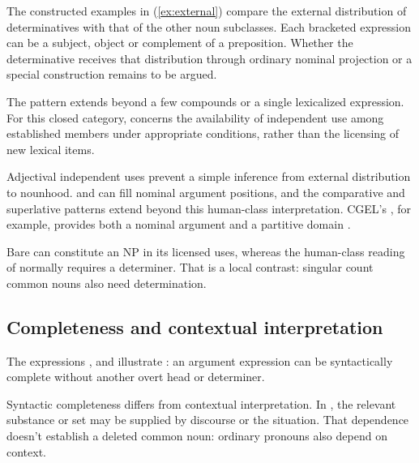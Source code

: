 \documentclass[12pt]{article}
\begin{document}
The constructed examples in (\ref{ex:external}) compare the external distribution of determinatives with that of the other noun subclasses. Each bracketed expression can be a subject, object or complement of a preposition. Whether the determinative receives that distribution through ordinary nominal projection or a special construction remains to be argued.

\ea\label{ex:external}
\ea {}\qquad {}\qquad {}
\ex {}\qquad {}\qquad {}
\ex {}\qquad {}\qquad {}
\ex {}\qquad {}\qquad {}
\z\z

The pattern extends beyond a few compounds or a single lexicalized expression. For this closed category,  concerns the availability of independent use among established members under appropriate conditions, rather than the licensing of new lexical items.

Adjectival independent uses prevent a simple inference from external distribution to nounhood.  and  can fill nominal argument positions, and the comparative and superlative patterns extend beyond this human-class interpretation. CGEL's , for example, provides both a nominal argument and a partitive domain \citep[332--333, 416--423]{huddleston2002}.

Bare  can constitute an NP in its licensed uses, whereas the human-class reading of  normally requires a determiner. That is a local contrast: singular count common nouns also need determination.

\subsection{Completeness and contextual interpretation}

The expressions ,  and  illustrate : an argument expression can be syntactically complete without another overt head or determiner.

Syntactic completeness differs from contextual interpretation. In , the relevant substance or set may be supplied by discourse or the situation. That dependence doesn't establish a deleted common noun: ordinary pronouns also depend on context.
\end{document}
